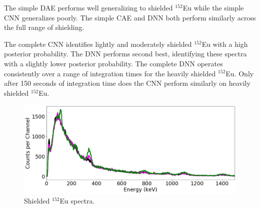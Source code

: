 The simple DAE performs well generalizing to shielded $^{152}$Eu while the simple CNN generalizes poorly. The simple CAE and DNN both perform similarly across the full range of shielding. 

The complete CNN identifies lightly and moderately shielded $^{152}$Eu with a high posterior probability. The DNN performs second best, identifying these spectra with a slightly lower posterior probability. The complete DNN operates consistently over a range of integration times for the heavily shielded $^{152}$Eu. Only after 150 seconds of integration time does the CNN perform similarly on heavily shielded $^{152}$Eu. %



\begin{figure}[H]
	\centering
	\includegraphics[width=1.0\linewidth]{images/shielded_eu152}
	\caption{Shielded $^{152}$Eu spectra.}
	\label{fig:shielded_eu152}
\end{figure}


